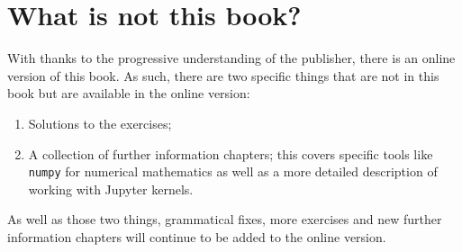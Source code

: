 \section{What is \textbf{not} this book?}

With thanks to the progressive understanding of the publisher, there is an online version of this book.
As such, there are two specific things that are not in this book but are
available in the online version:

\begin{enumerate}
    \item Solutions to the exercises;
    \item A collection of further information chapters; this covers specific
        tools like \texttt{numpy} for numerical mathematics as well as a more
        detailed description of working with Jupyter kernels.
\end{enumerate}

As well as those two things, grammatical fixes, more exercises and new further
information chapters will continue to be added to the online version.

